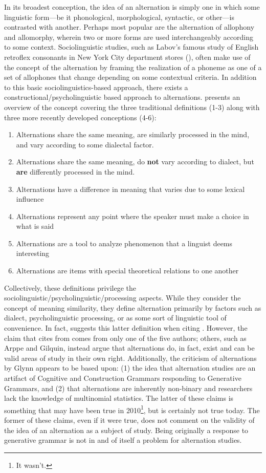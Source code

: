 In its broadest conception, the idea of an alternation is simply one in which some linguistic form—be it phonological, morphological, syntactic, or other—is contrasted with another. Perhaps most popular are the alternation of allophony and allomorphy, wherein two or more forms are used interchangeably according to some context. Sociolinguistic studies, such as Labov’s famous study of English retroflex consonants in New York City department stores (\citeyear{labov1986social}), often make use of the concept of the alternation by framing the realization of a phoneme as one of a set of allophones that change depending on some contextual criteria. In addition to this basic sociolinguistics-based approach, there exists a constructional/psycholinguistic based approach to alternations. \citet{pijpops2020} presents an overview of the concept covering the three traditional definitions (1-3) along with three more recently developed conceptions (4-6):
\begin{enumerate}
 	\item Alternations share the same meaning, are similarly processed in the mind, and vary according to some dialectal factor.
\item Alternations share the same meaning, do \textbf{not} vary according to dialect, but \textbf{are} differently processed in the mind.
\item Alternations have a difference in meaning that varies due to some lexical influence
\item Alternations represent any point where the speaker must make a choice in what is said
\item Alternations are a tool to analyze phenomenon that a linguist deems interesting
\item Alternations are items with special theoretical relations to one another
\end{enumerate}

Collectively, these definitions privilege the sociolinguistic/psycholinguistic/processing aspects. While they consider the concept of meaning similarity, they define alternation primarily by factors such as dialect, psycholinguistic processing, or as some sort of linguistic tool of convenience. In fact, \citet{pijpops2020} suggests this latter definition when citing \citet{arppe2010cognitive}. However, the claim that \citet{pijpops2020} cites from \citet{arppe2010cognitive} comes from only one of the five authors; others, such as Arppe and Gilquin, instead argue that alternations do, in fact, exist and can be valid areas of study in their own right. Additionally, the criticism of alternations by Glynn appears to be based upon: (1) the idea that alternation studies are an artifact of Cognitive and Construction Grammars responding to Generative Grammars, and (2) that alternations are inherently non-binary and researchers lack the knowledge of multinomial statistics. The latter of these claims is something that may have been true in 2010\footnote{It wasn't.}, but is certainly not true today. The former of these claims, even if it were true, does not comment on the validity of the idea of an alternation as a subject of study. Being originally a response to generative grammar is not in and of itself a problem for alternation studies.

